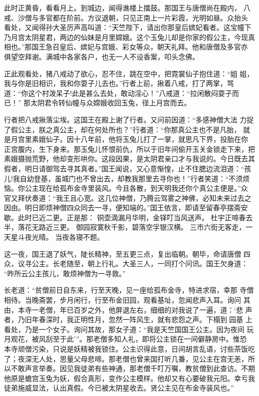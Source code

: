 此时正黄昏，看看月上。到城边，闻得谯楼上擂鼓。那国王与唐僧尚在殿内，
八戒、沙僧与多官都在阶前。方议退朝，只见正南上一片彩霞，光明如昼。众抬头
看处，又闻得孙大圣厉声高叫道：“天竺陛下，请出你那皇后嫔妃看者。这宝幢下
乃月宫太阴星君，两边的仙妹是月里嫦娥。这个玉兔儿却是你家的假公主，今现真
相也。”那国王急召皇后、嫔妃与宫娥、彩女等众，朝天礼拜。他和唐僧及多官亦
俱望空拜谢。满城中各家各户，也无一人不设香案，叩头念佛。

正此观看处，猪八戒动了欲心，忍不住，跳在空中，把霓裳仙子抱住道：“姐
姐，我与你是旧相识，我和你耍子儿去也。”行者上前，揪着八戒，打了两掌，骂
道：“你这个村泼呆子!此是甚么去处，敢动淫心！”八戒道：“拉闲散闷耍子而已！”
那太阴君令转仙幢与众嫦娥收回玉兔，径上月宫而去。

行者把八戒揪落尘埃。这国王在殿上谢了行者。又问前因道：“多感神僧大法
力捉了假公主，朕之真公主，却在何处所也？”行者道：“你那真公主也不是凡胎，
就是月宫里素娥仙子。因十八年前，他将玉兔儿打了一掌，就思凡下界，投胎在你
正宫腹内，生下身来。那玉兔儿怀恨前仇，所以于旧年间偷开玉关金锁走下来，把
素娥摄抛荒野，他却变形哄你。这段因果，是太阴君亲口才与我说的。今日既去其
假者，明日请御驾去寻其真者。”国王闻说，又心意惭惶，止不住腮边流泪道：“孩
儿!我自幼登基，虽城门也不曾出去，却教我那里去寻你也！”行者笑道：“不须烦
恼。你公主现在给孤布金寺里装风。今且各散，到天明我还你个真公主便是。”众
官又拜伏奏道：“我王且心宽。这几位神僧，乃腾云驾雾之神佛，必知未来过去之
因由。明日即烦神僧四众同去一寻，便知端的。”国王依言，即请至留春亭摆斋安
歇。此时已近二更。正是那：
铜壶滴漏月华明，金铎叮当风送声。
杜宇正啼春去半，落花无路近三更。
御园寂寞秋千影，碧落空孚银汉横。
三市六街无客走，一天星斗夜光晴。
当夜各寝不题。

这一夜，国王退了妖气，陡长精神，至五更三点，复出临朝。朝毕，命请唐僧
四众，议寻公主。长老随至，朝上行礼。大圣三人，一同打个问讯。国王欠身道：
“昨所云公主孩儿，敢烦神僧为一寻救。”

长老道：“贫僧前日自东来，行至天晚，见一座给孤布金寺，特进求宿，幸那
寺僧相待。当晚斋罢，步月闲行，行至布金旧园，观看基址，忽闻悲声入耳。询问
其由，本寺一老僧，年已百岁之外，他屏退左右，细细的对我说了一遍，道：‘悲
声者，乃旧年春深时，我正明性月，忽然一阵风生，就有悲怨之声。下榻到园基
上看处，乃是一个女子。询问其故，那女子道：“我是天竺国国王公主。因为夜间
玩月观花，被风刮至于此’”。那老僧多知人礼，即将公主锁在一间僻静房中。惟恐
本寺顽僧污染，只说是妖精被我锁住。公主识得此意，日间胡言乱语，讨些茶饭吃
了；夜深无人处，思量父母悲啼。那老僧也曾来国打听几番，见公主在宫无恙，所
以不敢声言举奏。因见我徒弟有些神通，那老僧千叮万嘱，教贫僧到此查访。不期
他原是蟾宫玉兔为妖，假合真形，变作公主模样。他却又有心要破我元阳。幸亏我
徒弟施威显法，认出真假。今已被太阴星收去。贤公主见在布金寺装风也。”

